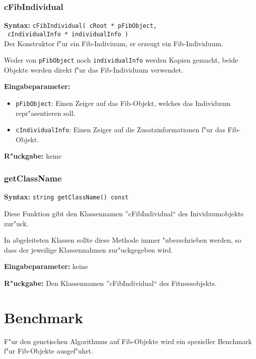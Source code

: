 \subsubsection{cFibIndividual}

\textbf{Syntax:} \verb|cFibIndividual( cRoot * pFibObject,| \\\verb| cIndividualInfo * individualInfo )| \\

Der Konstruktor f"ur ein Fib-Indiviuum, er erzeugt ein Fib-Individuum.

Weder von \verb|pFibObject| noch \verb|individualInfo| werden Kopien gemacht, beide Objekte werden direkt f"ur das Fib-Individuum verwendet.

\bigskip\noindent
\textbf{Eingabeparameter:}
\begin{itemize}
 \item \verb|pFibObject|: Einen Zeiger auf das Fib-Objekt, welches das Individuum repr"asentieren soll.
 \item \verb|cIndividualInfo|: Einen Zeiger auf die Zusatzinformationen f"ur das Fib-Objekt.
\end{itemize}

\bigskip\noindent
\textbf{R"uckgabe:} keine


\subsubsection{getClassName}

\textbf{Syntax:} \verb|string getClassName() const|

\bigskip\noindent
Diese Funktion gibt den Klassennamen ''cFibIndividual`` des Inividuumobjekts zur"uck.

In abgeleiteten Klassen sollte diese Methode immer "uberschrieben werden, so dass der jeweilige Klassennahmen zur"uckgegeben wird.

\bigskip\noindent
\textbf{Eingabeparameter:} keine

\bigskip\noindent
\textbf{R"uckgabe:} Den Klassennamen ''cFibIndividual`` des Fitnessobjekts.


\section{Benchmark}

F"ur den genetischen Algorithmus auf Fib-Objekte wird ein spezieller Benchmark f"ur Fib-Objekte ausgef"uhrt.

